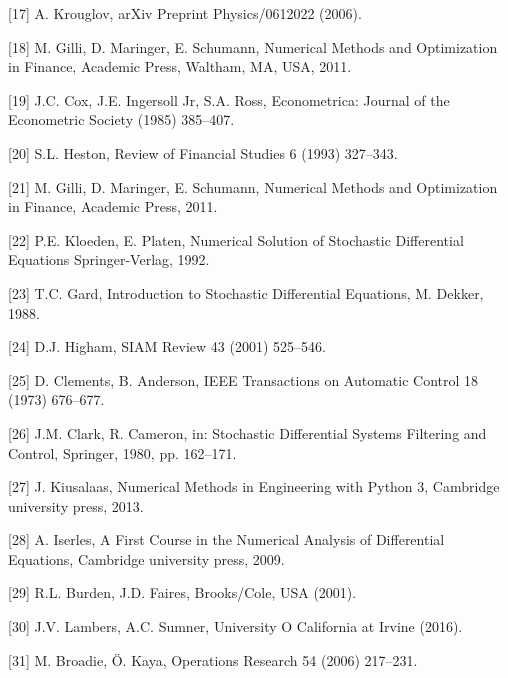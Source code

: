 \documentclass[12pt,twoside]{reedthesis}
\theoremstyle{definition}
\theoremstyle{definition}
\theoremstyle{remark}
\begin{document}
  \hypertarget{ref-krouglov2006intuitive}{}
  {[}17{]} A. Krouglov, arXiv Preprint Physics/0612022 (2006).
  
  \hypertarget{ref-nmof}{}
  {[}18{]} M. Gilli, D. Maringer, E. Schumann, Numerical Methods and
  Optimization in Finance, Academic Press, Waltham, MA, USA, 2011.
  
  \hypertarget{ref-cox1985theory}{}
  {[}19{]} J.C. Cox, J.E. Ingersoll Jr, S.A. Ross, Econometrica: Journal
  of the Econometric Society (1985) 385--407.
  
  \hypertarget{ref-heston1993closed}{}
  {[}20{]} S.L. Heston, Review of Financial Studies 6 (1993) 327--343.
  
  \hypertarget{ref-gilli_numerical_2011}{}
  {[}21{]} M. Gilli, D. Maringer, E. Schumann, Numerical Methods and
  Optimization in Finance, Academic Press, 2011.
  
  \hypertarget{ref-kloeden1992}{}
  {[}22{]} P.E. Kloeden, E. Platen, Numerical Solution of Stochastic
  Differential Equations Springer-Verlag, 1992.
  
  \hypertarget{ref-gard1988}{}
  {[}23{]} T.C. Gard, Introduction to Stochastic Differential Equations,
  M. Dekker, 1988.
  
  \hypertarget{ref-higham2001}{}
  {[}24{]} D.J. Higham, SIAM Review 43 (2001) 525--546.
  
  \hypertarget{ref-clements1973well}{}
  {[}25{]} D. Clements, B. Anderson, IEEE Transactions on Automatic
  Control 18 (1973) 676--677.
  
  \hypertarget{ref-clark1980maximum}{}
  {[}26{]} J.M. Clark, R. Cameron, in: Stochastic Differential Systems
  Filtering and Control, Springer, 1980, pp. 162--171.
  
  \hypertarget{ref-kiusalaas2013numerical}{}
  {[}27{]} J. Kiusalaas, Numerical Methods in Engineering with Python 3,
  Cambridge university press, 2013.
  
  \hypertarget{ref-iserles}{}
  {[}28{]} A. Iserles, A First Course in the Numerical Analysis of
  Differential Equations, Cambridge university press, 2009.
  
  \hypertarget{ref-burden2001}{}
  {[}29{]} R.L. Burden, J.D. Faires, Brooks/Cole, USA (2001).
  
  \hypertarget{ref-lambers}{}
  {[}30{]} J.V. Lambers, A.C. Sumner, University O California at Irvine
  (2016).
  
  \hypertarget{ref-broadie2006exact}{}
  {[}31{]} M. Broadie, Ö. Kaya, Operations Research 54 (2006) 217--231.
  
\end{document}
